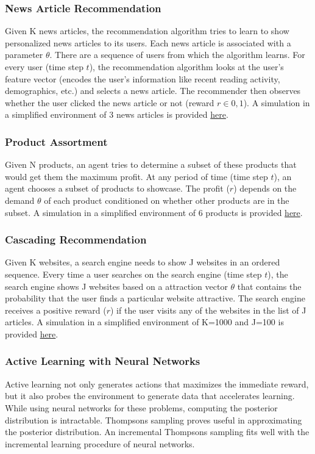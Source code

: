 \documentclass[11pt]{article}
\begin{document}
\subsubsection{News Article Recommendation}

Given K news articles, the recommendation algorithm tries to learn to show personalized news articles to its users. Each news article is associated with a parameter $\theta$. There are a sequence of users from which the algorithm learns. For every user (time step $t$), the recommendation algorithm looks at the user's feature vector (encodes the user's information like recent reading activity, demographics, etc.) and selects a news article. The recommender then observes whether the user clicked the news article or not (reward $r \in {0, 1}$). A simulation in a simplified environment of 3 news articles is provided \href{https://github.com/iosband/ts_tutorial/tree/master/src/news_recommendation}{here}.

\subsubsection{Product Assortment}

Given N products, an agent tries to determine a subset of these products that would get them the maximum profit. At any period of time (time step $t$), an agent chooses a subset of products to showcase. The profit ($r$) depends on the demand $\theta$ of each product conditioned on whether other products are in the subset. A simulation in a simplified environment of 6 products is provided \href{https://github.com/iosband/ts_tutorial/tree/master/src/assortment}{here}.

\subsubsection{Cascading Recommendation}

Given K websites, a search engine needs to show J websites in an ordered sequence. Every time a user searches on the search engine (time step $t$), the search engine shows J websites based on a attraction vector $\theta$ that contains the probability that the user finds a particular website attractive. The search engine receives a positive reward ($r$) if the user visits any of the websites in the list of J articles. A simulation in a simplified environment of K=1000 and J=100 is provided \href{https://github.com/iosband/ts_tutorial/tree/master/src/cascading}{here}.

\subsubsection{Active Learning with Neural Networks}
Active learning not only generates actions that maximizes the immediate reward, but it also probes the environment to generate data that accelerates learning. While using neural networks for these problems, computing the posterior distribution is intractable. Thompsons sampling proves useful in approximating the posterior distribution. An incremental Thompsons sampling fits well with the incremental learning procedure of neural networks. 
\end{document}
